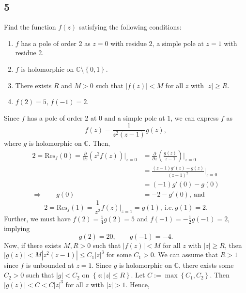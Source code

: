 \documentclass[12pt]{article}
\begin{document}
\subsection*{5}
\begin{tcolorbox}
Find the function $f(z)$ satisfying the following conditions:
\begin{enumerate}[label = (\alph*)]
\item $f$ has a pole of order 2 as $z = 0$ with residue 2, a simple pole at $z = 1$ with residue 2.
\item $f$ is holomorphic on $\mathbb{C} \setminus \left\{ 0,1 \right\}$.
\item There exists $R$ and $M > 0$ such that $|f(z)| < M$ for all $z$ with $|z| \geq R$.
\item $f(2) = 5$, $f(-1) = 2$.
\end{enumerate}
\end{tcolorbox}
Since $f$ has a pole of order 2 at 0 and a simple pole at 1, we can express $f$ as
\[ f(z) = \frac{1}{z^{2}(z-1)}g(z), \]
where $g$ is holomorphic on $\mathbb{C}$. Then,
\begin{align}
2 = \text{Res}_{f}(0) = \frac{\partial }{\partial z}\left( z^{2}f(z) \right)\bigg|_{z=0} & = \frac{\partial }{\partial z}\left( \frac{g(z)}{z-1}
\right)\bigg|_{z = 0} \nonumber \\
& = \frac{(z-1)g'(z) - g(z)}{(z-1)^{2}}\bigg|_{z=0}\nonumber \\
& = (-1)g'(0) - g(0) \nonumber \\
\Rightarrow  \qquad g(0) & = -2 - g'(0), \ \text{and}\ \label{5.1}
\end{align}
\begin{equation}
2 = \text{Res}_{f}(1) = \frac{1}{z^{2}}f(z)\bigg|_{z = 1} = g(1), \ \text{i.e.}\  g(1) = 2.
\label{5.2}
\end{equation}
Further, we must have $f(2) = \frac{1}{4}g(2) = 5$ and $f(-1) = -\frac{1}{2}g(-1) = 2$, implying
\begin{equation}
g(2) = 20, \qquad g(-1) = -4.
\label{5.3}
\end{equation}
Now, if there exists $M, R > 0$ such that $|f(z)| < M$ for all $z$ with $|z| \geq R$, then $|g(z)| < M|z^{2}(z-1)| \leq C_{1}|z|^{3}$ for some $C_{1} > 0$.
We can assume that $R > 1$ since $f$ is unbounded at $z = 1$. Since $g$ is holomorphic on $\mathbb{C}$, there exists some $C_{2} > 0$ such that $|g| <
C_{2}$ on $\left\{ z : |z| \leq R \right\}$. Let $C := \max\left\{ C_1, C_2 \right\}$. Then $|g(z)| < C < C|z|^{3}$ for all $z$ with $|z| > 1$. Hence,
\end{document}
